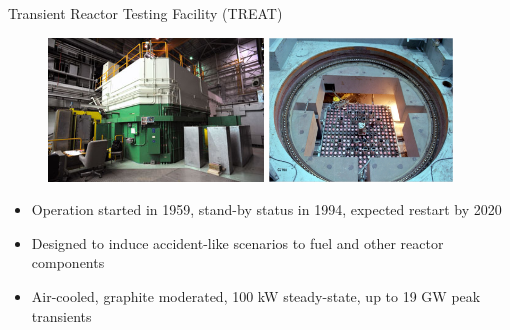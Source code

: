 \documentclass[8pt,xcolor=dvipnames]{beamer}
\begin{document}
\begin{frame}{Transient Reactor Testing Facility (TREAT)}

\begin{figure}
\includegraphics[height=1.5in]{figures/TREAT_outside.jpg}
\hspace{0.1in}
\includegraphics[height=1.5in]{figures/TREAT_core_view.png}
\end{figure}

\begin{block}{}
\begin{itemize}
\item Operation started in 1959, stand-by status in 1994, expected restart by 2020
\item Designed to induce accident-like scenarios to fuel and other reactor components 
\item Air-cooled, graphite moderated, 100 kW steady-state, up to 19 GW peak transients
\end{itemize}
\end{block}

\end{frame}
\end{document}
